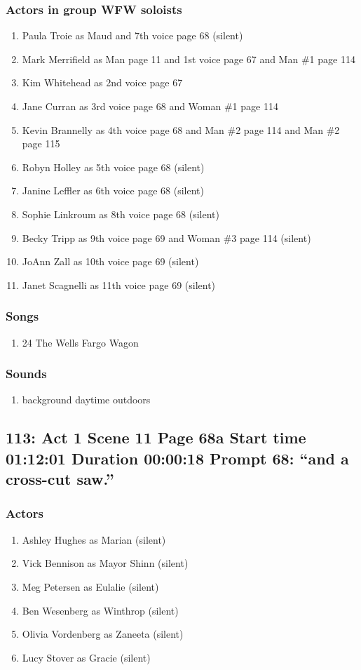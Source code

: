 \subsubsection{Actors in group WFW soloists}
\begin{enumerate}
\item Paula Troie as Maud and 7th voice page 68 (silent)
\item Mark Merrifield as Man page 11 and 1st voice page 67 and Man \#1 page 114
\item Kim Whitehead as 2nd voice page 67
\item Jane Curran as 3rd voice page 68 and Woman \#1 page 114
\item Kevin Brannelly as 4th voice page 68 and Man \#2 page 114 and Man \#2 page 115
\item Robyn Holley as 5th voice page 68 (silent)
\item Janine Leffler as 6th voice page 68 (silent)
\item Sophie Linkroum as 8th voice page 68 (silent)
\item Becky Tripp as 9th voice page 69 and Woman \#3 page 114 (silent)
\item JoAnn Zall as 10th voice page 69 (silent)
\item Janet Scagnelli as 11th voice page 69 (silent)
\end{enumerate}

\subsubsection{Songs}
\begin{enumerate}
\item 24 The Wells Fargo Wagon
\end{enumerate}\subsubsection{Sounds}
\begin{enumerate}
\item background daytime outdoors
\end{enumerate}
\subsection{113: Act 1 Scene 11 Page 68a Start time 01:12:01 Duration 00:00:18 Prompt 68: ``and a cross-cut saw.''}

\subsubsection{Actors}
\begin{enumerate}
\item Ashley Hughes as Marian (silent)
\item Vick Bennison as Mayor Shinn (silent)
\item Meg Petersen as Eulalie (silent)
\item Ben Wesenberg as Winthrop (silent)
\item Olivia Vordenberg as Zaneeta (silent)
\item Lucy Stover as Gracie (silent)
\end{enumerate}
